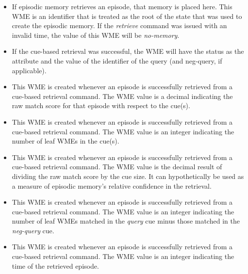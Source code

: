\begin{itemize}

\item {}

If episodic memory retrieves an episode, that memory is placed here. This WME is an identifier that is treated as the root of the state that was used to create the episodic memory. If the \emph{retrieve} command was issued with an invalid time, the value of this WME will be \emph{no-memory}.

\item {}

If the cue-based retrieval was successful, the WME will have the status as the attribute and the value of the identifier of the query (and neg-query, if applicable).

\item {}

This WME is created whenever an episode is successfully retrieved from a cue-based retrieval command. The WME value is a decimal indicating the raw match score for that episode with respect to the cue(s).

\item {}

This WME is created whenever an episode is successfully retrieved from a cue-based retrieval command.  The WME value is an integer indicating the number of leaf WMEs in the cue(s).

\item {}

This WME is created whenever an episode is successfully retrieved from a cue-based retrieval command.  The WME value is the decimal result of dividing the raw match score by the cue size.  It can hypothetically be used as a measure of episodic memory's relative confidence in the retrieval.

\item {}

This WME is created whenever an episode is successfully retrieved from a cue-based retrieval command.  The WME value is an integer indicating the number of leaf WMEs matched in the \emph{query} cue minus those matched in the \emph{neg-query} cue.

\item {}

This WME is created whenever an episode is successfully retrieved from a cue-based retrieval command.  The WME value is an integer indicating the time of the retrieved episode.


\end{itemize}
